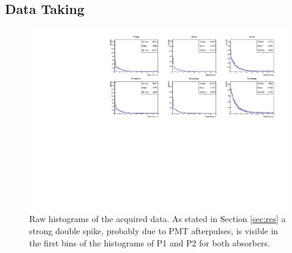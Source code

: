 \documentclass[../main.tex]{subfiles}
\begin{document}
        \FloatBarrier
        \begin{table}[ht]
            \centering
            \caption{Measured chamber efficiencies}
            \label{tab:efficiencies}
        \end{table}
    \FloatBarrier
\subsection{Data Taking}
    \begin{figure}[htb!]
        \centering
        \includegraphics[width=\linewidth]{images/histograms.pdf}
        \caption{Raw histograms of the acquired data. As stated in Section \ref{sec:res} a strong double spike, probably due to PMT afterpulses, is visible in the first bins of the histograms of P1 and P2 for both absorbers.}
        \label{fig:rawHisto}
    \end{figure}
\FloatBarrier
\end{document}
